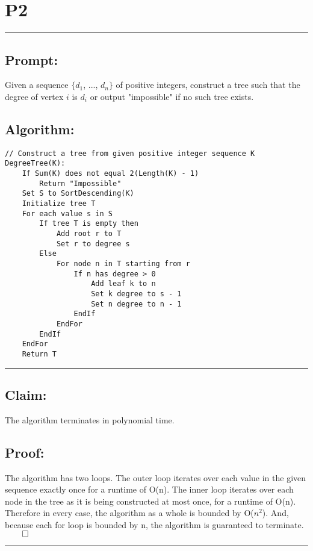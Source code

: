 \documentclass[11pt]{article}
\title{}
\author{}
\date{}
\begin{document}
\section*{P2}

\noindent\textcolor[RGB]{220,220,220}{\rule{\linewidth}{0.8pt}}

\subsection*{Prompt:} 
Given a sequence $\{d_1$, ..., $d_n\}$ of positive integers, construct a tree such that the degree of vertex $i$ is $d_i$ or output "impossible" if no such tree exists. 

\subsection*{Algorithm:} 
\begin{lstlisting}[basicstyle=\small]
// Construct a tree from given positive integer sequence K
DegreeTree(K):
	If Sum(K) does not equal 2(Length(K) - 1)
		Return "Impossible"
	Set S to SortDescending(K)
	Initialize tree T
	For each value s in S
		If tree T is empty then 
			Add root r to T
			Set r to degree s
		Else
			For node n in T starting from r
				If n has degree > 0
					Add leaf k to n
					Set k degree to s - 1
					Set n degree to n - 1
				EndIf
			EndFor
		EndIf
	EndFor
	Return T
\end{lstlisting}

\noindent\textcolor[RGB]{220,220,220}{\rule{\linewidth}{0.8pt}}
\linebreak

\subsection*{Claim:} 
The algorithm terminates in polynomial time. 

\subsection*{Proof:}
The algorithm has two loops. The outer loop iterates over each value in the given sequence exactly once for a runtime of O(n). The inner loop iterates over each node in the tree as it is being constructed at most once, for a runtime of O(n). Therefore in every case, the algorithm as a whole is bounded by O($n^2$). And, because each for loop is bounded by n, the algorithm is guaranteed to terminate. $\qed$

\noindent\textcolor[RGB]{220,220,220}{\rule{\linewidth}{0.8pt}}
\end{document}
